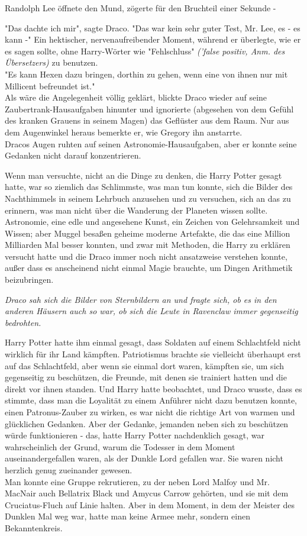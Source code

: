 {Randolph Lee öffnete den Mund, zögerte für den Bruchteil einer Sekunde -

"Das dachte ich mir", sagte Draco. "Das war kein sehr guter Test, Mr. Lee, es - es kann -" Ein hektischer, nervenaufreibender Moment, während er überlegte, wie er es sagen sollte, ohne Harry-Wörter wie "Fehlschluss" \emph{('false positiv, Anm. des Übersetzers)} zu benutzen.\\ "Es kann Hexen dazu bringen, dorthin zu gehen, wenn eine von ihnen nur mit Millicent befreundet ist."\\ Als wäre die Angelegenheit völlig geklärt, blickte Draco wieder auf seine Zaubertrank-Hausaufgaben hinunter und ignorierte (abgesehen von dem Gefühl des kranken Grauens in seinem Magen) das Geflüster aus dem Raum. Nur aus dem Augenwinkel heraus bemerkte er, wie Gregory ihn anstarrte.\\ Dracos Augen ruhten auf seinen Astronomie-Hausaufgaben, aber er konnte seine Gedanken nicht darauf konzentrieren.

Wenn man versuchte, nicht an die Dinge zu denken, die Harry Potter gesagt hatte, war so ziemlich das Schlimmste, was man tun konnte, sich die Bilder des Nachthimmels in seinem Lehrbuch anzusehen und zu versuchen, sich an das zu erinnern, was man nicht über die Wanderung der Planeten wissen sollte. Astronomie, eine edle und angesehene Kunst, ein Zeichen von Gelehrsamkeit und Wissen; aber Muggel besaßen geheime moderne Artefakte, die das eine Million Milliarden Mal besser konnten, und zwar mit Methoden, die Harry zu erklären versucht hatte und die Draco immer noch nicht ansatzweise verstehen konnte, außer dass es anscheinend nicht einmal Magie brauchte, um Dingen Arithmetik beizubringen.

\emph{Draco sah sich die Bilder von Sternbildern an und fragte sich, ob es in den anderen Häusern auch so war, ob sich die Leute in Ravenclaw immer gegenseitig bedrohten.}

Harry Potter hatte ihm einmal gesagt, dass Soldaten auf einem Schlachtfeld nicht wirklich für ihr Land kämpften. Patriotismus brachte sie vielleicht überhaupt erst auf das Schlachtfeld, aber wenn sie einmal dort waren, kämpften sie, um sich gegenseitig zu beschützen, die Freunde, mit denen sie trainiert hatten und die direkt vor ihnen standen. Und Harry hatte beobachtet, und Draco wusste, dass es stimmte, dass man die Loyalität zu einem Anführer nicht dazu benutzen konnte, einen Patronus-Zauber zu wirken, es war nicht die richtige Art von warmen und glücklichen Gedanken. Aber der Gedanke, jemanden neben sich zu beschützen würde funktionieren - das, hatte Harry Potter nachdenklich gesagt, war wahrscheinlich der Grund, warum die Todesser in dem Moment auseinandergefallen waren, als der Dunkle Lord gefallen war. Sie waren nicht herzlich genug zueinander gewesen.\\ Man konnte eine Gruppe rekrutieren, zu der neben Lord Malfoy und Mr. MacNair auch Bellatrix Black und Amycus Carrow gehörten, und sie mit dem Cruciatus-Fluch auf Linie halten. Aber in dem Moment, in dem der Meister des Dunklen Mal weg war, hatte man keine Armee mehr, sondern einen Bekanntenkreis.

}
